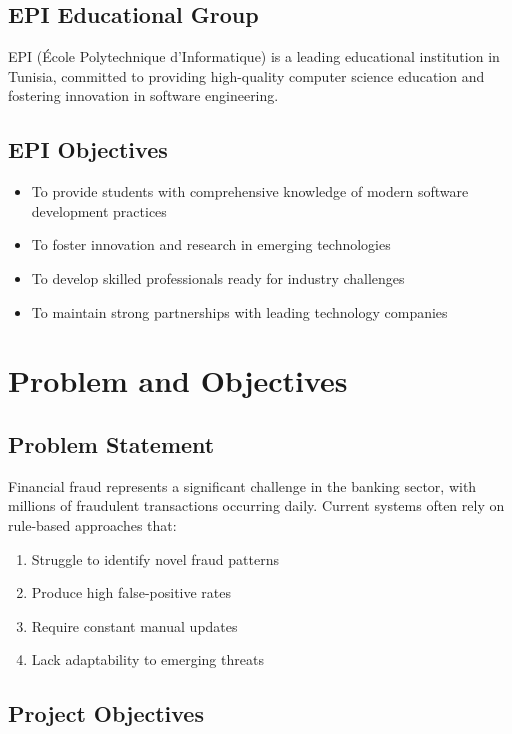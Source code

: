 \documentclass[12pt,a4paper,twoside]{report}
\begin{document}
\subsection{EPI Educational Group}

EPI (École Polytechnique d'Informatique) is a leading educational institution in Tunisia, committed to providing high-quality computer science education and fostering innovation in software engineering.

\subsection{EPI Objectives}

\begin{itemize}
    \item To provide students with comprehensive knowledge of modern software development practices
    \item To foster innovation and research in emerging technologies
    \item To develop skilled professionals ready for industry challenges
    \item To maintain strong partnerships with leading technology companies
\end{itemize}

\section{Problem and Objectives}

\subsection{Problem Statement}

Financial fraud represents a significant challenge in the banking sector, with millions of fraudulent transactions occurring daily. Current systems often rely on rule-based approaches that:

\begin{enumerate}
    \item Struggle to identify novel fraud patterns
    \item Produce high false-positive rates
    \item Require constant manual updates
    \item Lack adaptability to emerging threats
\end{enumerate}

\subsection{Project Objectives}
\end{document}
